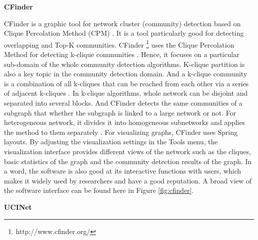\textbf{CFinder}

CFinder is a graphic tool for network cluster (community) detection based on Clique Percolation Method (CPM) \cite{kumpula2008sequential}. It is a tool particularly good for detecting overlapping and Top-K communities. CFinder \footnote{http://www.cfinder.org/} uses the Clique Percolation Method for detecting k-clique communities \cite{palla2005uncovering}. Hence, it focuses on a particular sub-domain of the whole community detection algorithms. K-clique partition is also a key topic in the community detection domain. And a k-clique community is a combination of all k-cliques that can be reached from each other via a series of adjacent k-cliques \cite{adamcsek2006cfinder}. In k-clique algorithms,  whole network can be disjoint and separated into several blocks. And CFinder detects the same communities of a subgraph that whether the subgraph is linked to a large network or not. For heterogeneous network, it divides it into homogeneous subnetworks and applies the method to them separately \cite{bartaonline}.  For visualizing graphs, CFinder uses Spring layouts. By adjusting the visualization settings in the Tools menu, the visualization interface provides different views of the network such as the  cliques, basic statistics of the graph and the community detection  results of  the graph. In a word, the software is also good at its interactive functions with users, which makes it widely used by researchers and have a good reputation. A broad view of the software interface can be found here in Figure \ref{fig:cfinder}.

\textbf{UCINet}

